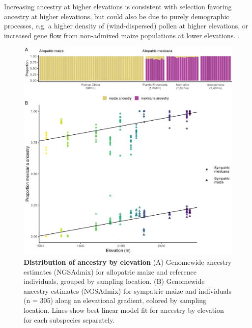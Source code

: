Increasing \mexicana ancestry at higher elevations is consistent with selection favoring \mexicana ancestry at higher elevations, but could also be due to purely demographic processes, e.g. a higher density of (wind-dispersed) \mexicana pollen at higher elevations, or increased gene flow from non-admixed maize populations at lower elevations. .

\begin{figure}[ht]
\includegraphics[width=\textwidth]{chapter2/figures/global_anc_multi.png}
\caption{\color{Gray} \textbf{Distribution of \mexicana ancestry by elevation} (A) Genomewide ancestry estimates (NGSAdmix) for allopatric maize and \mexicana reference individuals, grouped by sampling location. (B) Genomewide \mexicana ancestry estimates (NGSAdmix) for sympatric maize and \mexicana individuals (n = 305) along an elevational gradient, colored by sampling location. Lines show best linear model fit for \mexicana ancestry by elevation for each subspecies separately.}
\label{global_anc_multi}
\end{figure}

